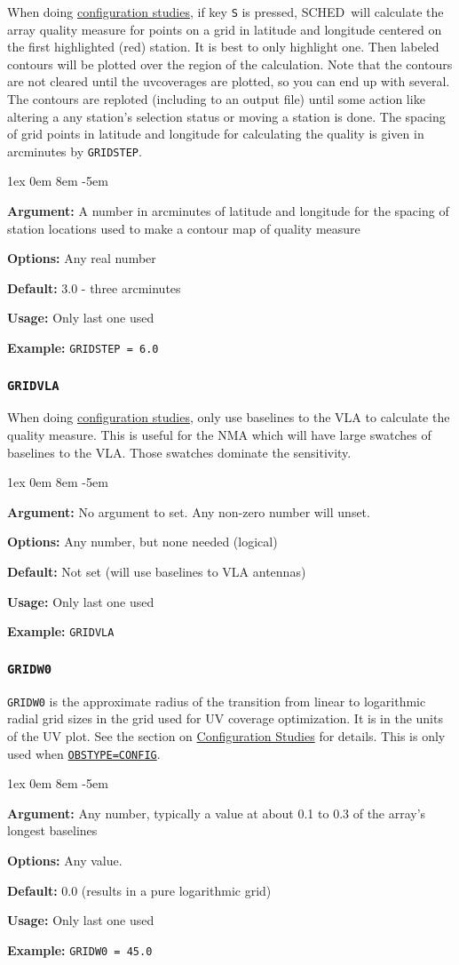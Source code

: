 \documentclass{report}
\newcommand{\schedb}{{\sc SCHED~}}
\newcommand{\rcwbox}[5]{
  \begin{list}{}{\parsep 1ex  \itemsep 0em
                 \leftmargin 8em  \itemindent -5em }
    \item {\bf Argument:} #1
    \item {\bf Options:}  #2
    \item {\bf Default:}  #3
    \item {\bf Usage:}    #4
    \item {\bf Example:}  #5
  \end{list}
}
\begin{document}
When doing 
{\hyperref[SEC:CONFIG]{configuration studies}}, if key {\tt S}
is pressed, \schedb will calculate the array quality measure for
points on a grid in latitude and longitude centered on the first
highlighted (red) station.  It is best to only highlight one.  Then
labeled contours will be plotted over the region of the calculation.
Note that the contours are not cleared until the uvcoverages are
plotted, so you can end up with several.  The contours are reploted
(including to an output file) until some action like altering a any
station's selection status or moving a station is done.  The spacing
of grid points in latitude and longitude for calculating the quality
is given in arcminutes by {\tt GRIDSTEP}.

\rcwbox
{A number in arcminutes of latitude and longitude for the spacing of
station locations used to make a contour map of quality measure}
{Any real number}
{3.0 - three arcminutes}
{Only last one used}
{{\tt GRIDSTEP = 6.0}}

\subsubsection{\label{MP:GRIDVLA}{\tt GRIDVLA}}

When doing 
{\hyperref[SEC:CONFIG]{configuration studies}}, only use baselines
to the VLA to calculate the quality measure.  This is useful for the NMA
which will have large swatches of baselines to the VLA.  Those swatches
dominate the sensitivity.

\rcwbox
{No argument to set.  Any non-zero number will unset.}
{Any number, but none needed (logical)}
{Not set (will use baselines to VLA antennas)}
{Only last one used}
{{\tt GRIDVLA}}

\subsubsection{\label{MP:GRIDW0}{\tt GRIDW0}}

{\tt GRIDW0} is the approximate radius of the transition
from linear to logarithmic radial grid sizes in the grid used for UV
coverage optimization.  It is in the units of the UV plot.
See the section on 
{\hyperref[SEC:CONFIG]{Configuration Studies}}
for details.  This is only used when
{\hyperref[MP:OBSTYPE]{{\tt OBSTYPE=CONFIG}}}.

\rcwbox
{Any number, typically a value at about 0.1 to 0.3 of the array's longest
baselines}
{Any value.}
{0.0 (results in a pure logarithmic grid)}
{Only last one used}
{{\tt GRIDW0 = 45.0}}
\end{document}
